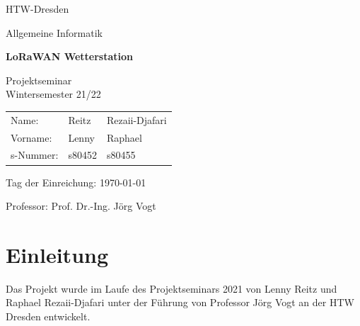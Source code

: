 \documentclass[12pt]{article}
\begin{document}
  \begin{titlepage}

    \begin{center}
      \Huge
  
      HTW-Dresden
  
      Allgemeine Informatik
  
      \bigskip
  
      \LARGE
  
      \vfill
  
      \huge
  
      \textbf{LoRaWAN Wetterstation}
  
      \LARGE
  
      \vfill
  
      Projektseminar\\
      Wintersemester 21/22
  
      \bigskip
  
    \end{center}
  
    \vfill
  
    \Large

  
    \vspace*{2\bigskipamount}
  
    \centering

    \begingroup
      \setlength{\tabcolsep}{12pt}
      \begin{tabular}{lll}
        Name:     & Reitz   & Rezaii-Djafari\\[2.0ex]
        Vorname:  & Lenny   & Raphael\\[2.0ex]
        s-Nummer: & s80452  & s80455
      \end{tabular}
    \endgroup
  
    \vspace*{4\bigskipamount}
  

    Tag der Einreichung: \today
  
    \vspace*{2\bigskipamount}
  
    Professor: Prof. Dr.-Ing. Jörg Vogt 
  
  \end{titlepage}

  \newpage


  \tableofcontents


  \newpage


  \section{Einleitung}
    Das Projekt wurde im Laufe des Projektseminars 2021 von Lenny Reitz und Raphael Rezaii-Djafari unter der Führung von
    Professor Jörg Vogt an der HTW Dresden entwickelt.
\end{document}
